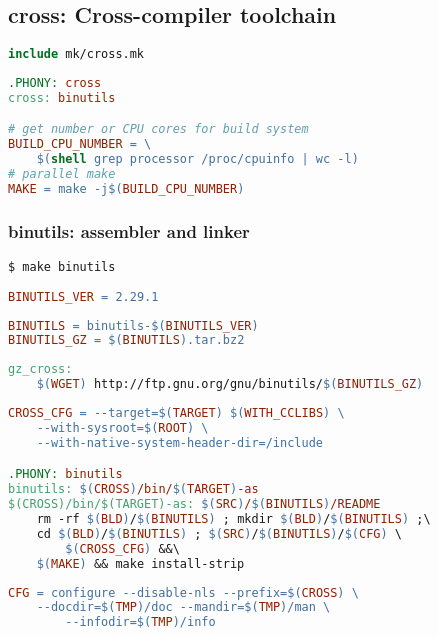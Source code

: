 \subsection{cross: Cross-compiler toolchain}

\begin{lstlisting}[language=make,title=Makefile]
include mk/cross.mk
\end{lstlisting}

\begin{lstlisting}[language=make,title=mk/cross]
.PHONY: cross
cross: binutils

# get number or CPU cores for build system
BUILD_CPU_NUMBER = \
	$(shell grep processor /proc/cpuinfo | wc -l)
# parallel make
MAKE = make -j$(BUILD_CPU_NUMBER)
\end{lstlisting}

\subsubsection{binutils: assembler and linker}

\begin{lstlisting}
$ make binutils
\end{lstlisting}
\begin{lstlisting}[language=make,title=mk/version]
BINUTILS_VER = 2.29.1
\end{lstlisting}
\begin{lstlisting}[language=make,title=mk/package]
BINUTILS = binutils-$(BINUTILS_VER)
BINUTILS_GZ = $(BINUTILS).tar.bz2
\end{lstlisting}
\begin{lstlisting}[language=make,title=mk/gz]
gz_cross:
	$(WGET) http://ftp.gnu.org/gnu/binutils/$(BINUTILS_GZ)
\end{lstlisting}
\begin{lstlisting}[language=make,title=mk/cross]
CROSS_CFG = --target=$(TARGET) $(WITH_CCLIBS) \
	--with-sysroot=$(ROOT) \
	--with-native-system-header-dir=/include  

.PHONY: binutils
binutils: $(CROSS)/bin/$(TARGET)-as
$(CROSS)/bin/$(TARGET)-as: $(SRC)/$(BINUTILS)/README
	rm -rf $(BLD)/$(BINUTILS) ; mkdir $(BLD)/$(BINUTILS) ;\
	cd $(BLD)/$(BINUTILS) ; $(SRC)/$(BINUTILS)/$(CFG) \
		$(CROSS_CFG) &&\
	$(MAKE) && make install-strip
\end{lstlisting}
\begin{lstlisting}[language=make,title=mk/cfg]
CFG = configure --disable-nls --prefix=$(CROSS) \
	--docdir=$(TMP)/doc --mandir=$(TMP)/man \
		--infodir=$(TMP)/info
\end{lstlisting}

